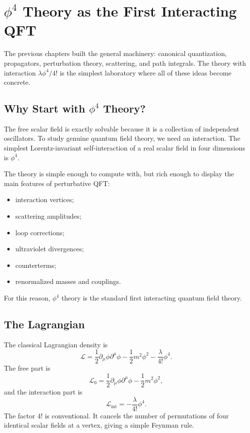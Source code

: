 \chapter{\texorpdfstring{\(\phi^4\) Theory as the First Interacting QFT}{phi4 Theory as the First Interacting QFT}}

\begin{remarkbox}
The previous chapters built the general machinery: canonical quantization,
propagators, perturbation theory, scattering, and path integrals. The theory
with interaction \(\lambda\phi^4/4!\) is the simplest laboratory where all of
these ideas become concrete.
\end{remarkbox}

\section{Why Start with \texorpdfstring{\(\phi^4\)}{phi4} Theory?}

The free scalar field is exactly solvable because it is a collection of
independent oscillators. To study genuine quantum field theory, we need an
interaction. The simplest Lorentz-invariant self-interaction of a real scalar
field in four dimensions is \(\phi^4\).

The theory is simple enough to compute with, but rich enough to display the main
features of perturbative QFT:
\begin{itemize}
    \item interaction vertices;
    \item scattering amplitudes;
    \item loop corrections;
    \item ultraviolet divergences;
    \item counterterms;
    \item renormalized masses and couplings.
\end{itemize}
For this reason, \(\phi^4\) theory is the standard first interacting quantum
field theory.

\section{The Lagrangian}

The classical Lagrangian density is
\[
    \mathcal{L}
    = \frac{1}{2}\partial_\mu\phi\partial^\mu\phi
      -\frac{1}{2}m^2\phi^2
      -\frac{\lambda}{4!}\phi^4.
\]
The free part is
\[
    \mathcal{L}_0
    = \frac{1}{2}\partial_\mu\phi\partial^\mu\phi
      -\frac{1}{2}m^2\phi^2,
\]
and the interaction part is
\[
    \mathcal{L}_{\mathrm{int}}
    = -\frac{\lambda}{4!}\phi^4.
\]
The factor \(4!\) is conventional. It cancels the number of permutations of four
identical scalar fields at a vertex, giving a simple Feynman rule.

